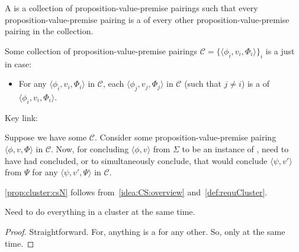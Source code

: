 \begin{note}
  A  is a collection of proposition-value-premise pairings such that every proposition-value-premise pairing is a \requ{} of every other proposition-value-premise pairing in the collection.
\end{note}

\begin{note}[\requCluster{3}]
  \begin{definition}[A \requCluster{1}]
    \label{def:requCluster}
    Some collection of proposition-value-premise pairings \(\mathcal{C} = \{\langle \phi_{i}, v_{i}, \Phi_{i} \rangle\}_{i}\) is a \emph{\cluster{}} just in case:
    \begin{itemize}
    \item
      For any \(\langle \phi_{i}, v_{i}, \Phi_{i} \rangle\) in \(\mathcal{C}\), each \(\langle \phi_{j}, v_{j}, \Phi_{j} \rangle\) in \(\mathcal{C}\) (such that \(j \ne i\)) is a \requ{} of \(\langle \phi_{i}, v_{i}, \Phi_{i} \rangle\).
    \end{itemize}
    \vspace{-\baselineskip}
  \end{definition}

  Key link:

  \begin{proposition}
    \label{prop:cluster:csN}
    Suppose we have some  \(\mathcal{C}\).
    Consider some proposition-value-premise pairing \(\langle \phi,v,\Phi \rangle\) in \(\mathcal{C}\).
    Now, for concluding \(\langle \phi,v \rangle\) from \(\Sigma\) to be an instance of \csN{}, need to have had concluded, or to simultaneously conclude, that would conclude \(\langle \psi,v' \rangle\) from \(\Psi\) for any \(\langle \psi,v',\Psi \rangle\) in \(\mathcal{C}\).
  \end{proposition}

  \autoref{prop:cluster:csN} follows from~\autoref{idea:CS:overview} and~\autoref{def:requCluster}.

  \begin{proposition}
    \label{prop:cluster:simul}
    Need to do everything in a cluster at the same time.
    \begin{proof}
      Straightforward.
      For, anything is a \requ{} for any other.
      So, only \csV{} at the same time.
    \end{proof}
  \end{proposition}
\end{note}

